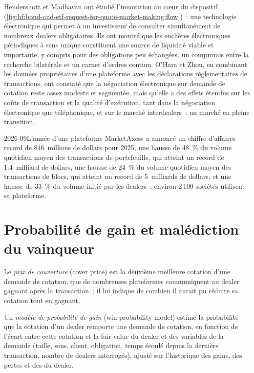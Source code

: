 Hendershott et Madhavan ont étudié l'innovation au cœur du dispositif (\cref{fig:hf:bond-and-etf-request-for-quote-market-making:flow})~: une technologie électronique
qui permet à un investisseur de consulter simultanément de nombreux dealers obligataires. Ils ont montré que les enchères électroniques périodiques à sens unique constituent une source de liquidité viable et
importante, y compris pour des obligations peu échangées, un compromis entre la recherche bilatérale et un carnet d'ordres continu. O'Hara et Zhou,
en combinant les données propriétaires d'une plateforme avec les déclarations réglementaires de transactions, ont constaté que la négociation électronique sur demande de cotation reste assez modeste et
segmentée, mais qu'elle a des effets étendus sur les coûts de transaction et la qualité d'exécution, tant dans la négociation électronique que téléphonique, et sur le marché
interdealers~: un marché en pleine transition.

\begin{dated}{2026-09}{L'année d'une plateforme}\label{dat:hf:bond-and-etf-request-for-quote-market-making:mktx}
MarketAxess a annoncé un chiffre d'affaires record de 846~millions de dollars pour 2025, une hausse de 48~\% du volume quotidien moyen des transactions de portefeuille, qui atteint un record de 1.4~milliard de dollars,
une hausse de 24~\% du volume quotidien moyen des transactions de blocs, qui atteint un record de 5~milliards de dollars, et une hausse de 33~\% du volume initié par les dealers~; environ 2\,100 sociétés utilisent
sa plateforme.
\end{dated}

\section{Probabilité de gain et malédiction du vainqueur}

\begin{definition}\label{def:hf:bond-and-etf-request-for-quote-market-making:cover}
Le \emph{prix de couverture} (cover price) est la deuxième meilleure cotation d'une demande de cotation, que de nombreuses plateformes communiquent au dealer gagnant après
la transaction~; il lui indique de combien il aurait pu réduire sa cotation tout en gagnant.
\end{definition}

\begin{definition}\label{def:hf:bond-and-etf-request-for-quote-market-making:win}
Un \emph{modèle de probabilité de gain} (win-probability model) estime la probabilité que la cotation d'un dealer remporte une demande de cotation, en fonction
de l'écart entre cette cotation et la fair value du dealer et des variables de la demande (taille, sens, client, obligation, temps écoulé depuis la dernière transaction, nombre de
dealers interrogés), ajusté sur l'historique des gains, des pertes et des  du dealer.
\end{definition}

